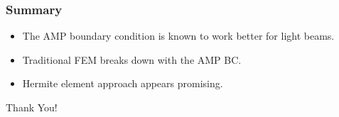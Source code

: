 \documentclass[8pt]{beamer}
\begin{document}
\begin{frame}
    \frametitle{Summary}
    \begin{itemize}
        \item The AMP boundary condition is known to work better for light beams.
        \item Traditional FEM breaks down with the AMP BC.
        \item Hermite element approach appears promising.
    \end{itemize}
\end{frame}

\begin{frame}
    \begin{center}
    \textcolor{RPIred}{\Huge Thank You!}
    \end{center}
\end{frame}
\end{document}
